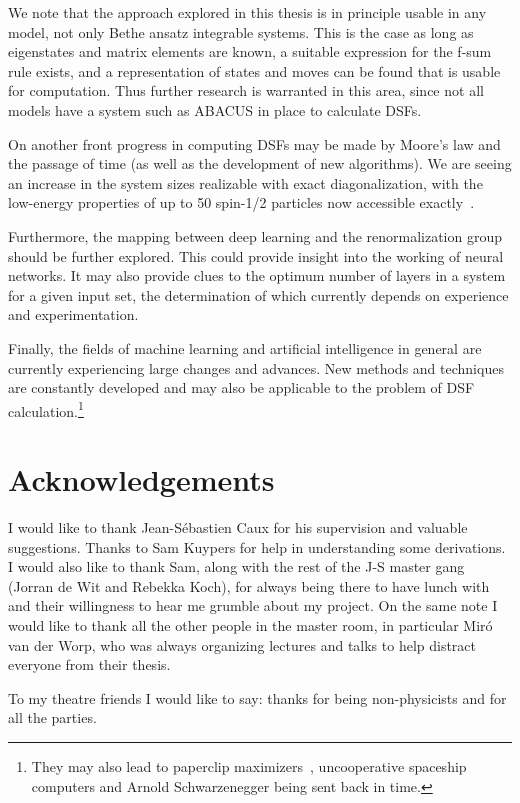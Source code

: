 \documentclass[11pt, a4paper]{report} %
\begin{document}
We note that the approach explored in this thesis is in principle usable in any model, not only Bethe ansatz integrable systems.
This is the case as long as eigenstates and matrix elements are known, a suitable expression for the f-sum rule exists, and a representation of states and moves can be found that is usable for computation.
Thus further research is warranted in this area, since not all models have a system such as ABACUS in place to calculate DSFs.

On another front progress in computing DSFs may be made by Moore's law and the passage of time (as well as the development of new algorithms).
We are seeing an increase in the system sizes realizable with exact diagonalization, with the low-energy properties of up to 50 spin-1/2 particles now accessible exactly~\cite{wietek18_sublat_codin_algor_distr_memor}.

Furthermore, the mapping between deep learning and the renormalization group~\cite{Mehta2014} should be further explored.
This could provide insight into the working of neural networks.
It may also provide clues to the optimum number of layers in a system for a given input set, the determination of which currently depends on experience and experimentation.

Finally, the fields of machine learning and artificial intelligence in general are currently experiencing large changes and advances.
New methods and techniques are constantly developed and may also be applicable to the problem of DSF calculation.\footnote{They may also lead to paperclip maximizers~\cite{tegmark}, uncooperative spaceship computers and Arnold Schwarzenegger being sent back in time.}

\section{Acknowledgements}
I would like to thank Jean-Sébastien Caux for his supervision and valuable suggestions.
Thanks to Sam Kuypers for help in understanding some derivations.
I would also like to thank Sam, along with the rest of the J-S master gang (Jorran de Wit and Rebekka Koch), for always being there to have lunch with and their willingness to hear me grumble about my project.
On the same note I would like to thank all the other people in the master room, in particular Miró van der Worp, who was always organizing lectures and talks to help distract everyone from their thesis.

To my theatre friends I would like to say: thanks for being non-physicists and for all the parties.
\end{document}
